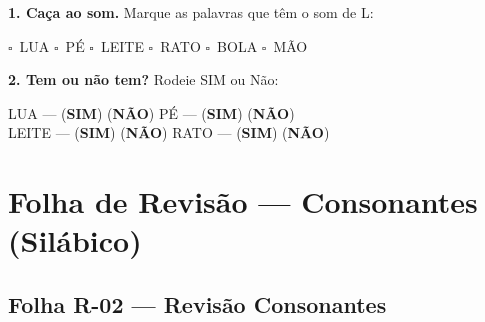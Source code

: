 \begin{somletra}[title={\faMusic~Atividade de Som da Letra --- B\^onus (n\~ao vale nota)}]
\textbf{1. Ca\c{c}a ao som.} Marque as palavras que t\^e{}m o som de L:
\begin{center}
$\square$~LUA \quad $\square$~P\'E \quad $\square$~LEITE \quad $\square$~RATO \quad $\square$~BOLA \quad $\square$~M\~AO
\end{center}

\textbf{2. Tem ou n\~ao{} tem?} Rodeie SIM ou N\~ao:
\begin{center}
LUA --- (\textbf{SIM}) (\textbf{N\~AO}) \quad P\'E --- (\textbf{SIM}) (\textbf{N\~AO}) \\ LEITE --- (\textbf{SIM}) (\textbf{N\~AO}) \quad RATO --- (\textbf{SIM}) (\textbf{N\~AO})
\end{center}
\end{somletra}



\section{Folha de Revisão --- Consonantes (Silábico)}


\subsection{Folha R-02 --- Revisão Consonantes}

